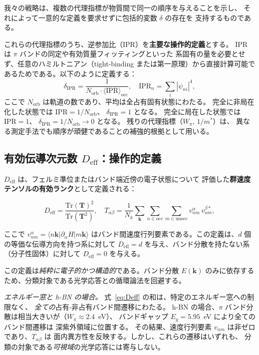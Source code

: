 \documentclass[twocolumn,showpacs,preprintnumbers,amsmath,amssymb,prb]{revtex4-2}
\begin{document}
我々の戦略は、複数の代理指標が物質間で同一の順序を与えることを示し、
それによって一意的な定義を要求せずに包括的変数 $\delta$ の存在を
支持するものである。

これらの代理指標のうち、逆参加比（IPR）を\textbf{主要な操作的定義}とする。
IPR は $\pi$ バンドの同定や有効質量フィッティングといった
系固有の量を必要とせず、任意のハミルトニアン（tight-binding
または第一原理）から直接計算可能であるためである。以下のように定義する：
\begin{equation}
  \delta_\mathrm{IPR} = \frac{1}{N_\mathrm{orb} \cdot
    \langle \mathrm{IPR} \rangle_\mathrm{occ}},
  \quad
  \mathrm{IPR}_n = \sum_i |\psi_{ni}|^4,
  \label{eq:delta_IPR}
\end{equation}
ここで $N_\mathrm{orb}$ は軌道の数であり、平均は全占有固有状態にわたる。
完全に非局在化した状態では $\mathrm{IPR} = 1/N_\mathrm{orb}$、
$\delta_\mathrm{IPR} = 1$ となる。
完全に局在した状態では $\mathrm{IPR} = 1$、
$\delta_\mathrm{IPR} = 1/N_\mathrm{orb} \to 0$ となる。
残りの代理指標（$W_\pi$, $1/m^*$）は、
異なる測定手法でも順序が頑健であることの補強的根拠として用いる。

\subsection{有効伝導次元数 $D_\mathrm{eff}$：操作的定義}
\label{sec:Deff}

$D_\mathrm{eff}$ は、フェルミ準位またはバンド端近傍の電子状態について
評価した\textbf{群速度テンソルの有効ランク}として定義される：

\begin{equation}
  D_\mathrm{eff}
    = \frac{\mathrm{Tr}(\mathbf{T})^2}{\mathrm{Tr}(\mathbf{T}^2)},
  \quad
  T_{\alpha\beta}
    = \frac{1}{N_k} \sum_{\bm{k}} \sum_{n \in \mathrm{occ}} \sum_{m \in \mathrm{unocc}}
    v_{nm}^{\alpha}\, v_{nm}^{\beta *},
  \label{eq:Deff}
\end{equation}

\noindent ここで $v_{nm}^{\alpha} = \langle n\bm{k} | \partial_\alpha H | m\bm{k} \rangle$
はバンド間速度行列要素である。この定義は、$d$ 個の等価な伝導方向を持つ系に対して
$D_\mathrm{eff} = d$ を与え、バンド分散を持たない系（分子性固体）に対して
$D_\mathrm{eff} = 0$ を与える。

この定義は\emph{純粋に電子的かつ構造的}である。バンド分散 $E(\bm{k})$
のみに依存するため、分類対象である光学応答との循環論法を回避する。

\emph{エネルギー窓と h-BN の場合。}
式~\ref{eq:Deff} の和は、特定のエネルギー窓への制限なく、
\emph{全ての}占有-非占有バンド間遷移にわたる。
h-BN の場合、$\pi$ バンド分散は相当大きいが（$W_\pi \approx 2.4$~eV）、
バンドギャップ $E_g = 5.95$~eV により全てのバンド間遷移は
深紫外領域に位置する。
その結果、速度行列要素 $v_{nm}$ は非ゼロであり、$T_{\alpha\beta}$ は
面内異方性を反映する。しかし、これらの遷移はいずれも、
分類の対象である\emph{可視域}の光学応答には寄与しない。
\end{document}
